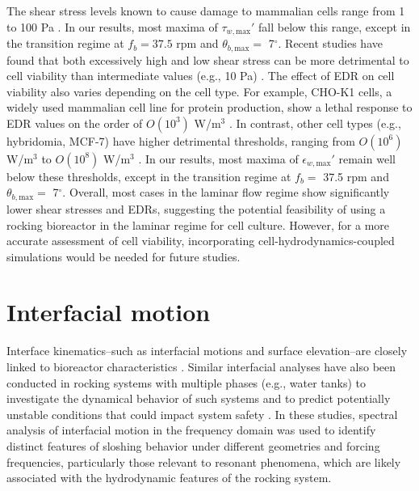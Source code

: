 \documentclass[final,3p,times,twocolumn,authoryear]{elsarticle}
\theoremstyle{definition}
\begin{document}
The shear stress levels known to cause damage to mammalian cells range from 1 to 100 Pa \citep{Mardikar2000,Brindley2011,Haroon2022}. In our results, most maxima of $\tau_{w,\textrm{max}}'$ fall below this range, except in the transition regime at $f_b=37.5$ rpm and $\theta_{b,\textrm{max}}=$ 7$^\circ$. Recent studies have found that both excessively high and low shear stress can be more detrimental to cell viability than intermediate values (e.g., 10 Pa) \citep{Mardikar2000}. The effect of EDR on cell viability also varies depending on the cell type. For example, CHO-K1 cells, a widely used mammalian cell line for protein production, show a lethal response to EDR values on the order of $O(10^3)$ W/m$^3$ \citep{Hu2011}. In contrast, other cell types (e.g., hybridomia, MCF-7) have higher detrimental thresholds, ranging from $O(10^6)$ W/m$^3$ to $O(10^8)$ W/m$^3$ \citep{Hu2011,Mcrae2024}. In our results, most maxima of $\epsilon_{w,\textrm{max}}'$ remain well below these thresholds, except in the transition regime at $f_b=$ 37.5 rpm and $\theta_{b,\textrm{max}}=$ 7$^\circ$. Overall, most cases in the laminar flow regime show significantly lower shear stresses and EDRs, suggesting the potential feasibility of using a rocking bioreactor in the laminar regime for cell culture. However, for a more accurate assessment of cell viability, incorporating cell-hydrodynamics-coupled simulations would be needed for future studies.


\section{Interfacial motion} \label{sec:spectral}


Interface kinematics--such as interfacial motions and surface elevation--are closely linked to bioreactor characteristics \citep{Zhan2019}. Similar interfacial analyses have also been conducted in rocking systems with multiple phases (e.g., water tanks) to investigate the dynamical behavior of such systems and to predict potentially unstable conditions that could impact system safety 
\citep{Rocca2000,Ibrahim2005,Jung2015,Zhao2018}. In these studies, spectral analysis of interfacial motion in the frequency domain was used to identify distinct features of sloshing behavior under different geometries and forcing frequencies, particularly those relevant to resonant phenomena, which are likely associated with the hydrodynamic features of the rocking system. 
\end{document}
